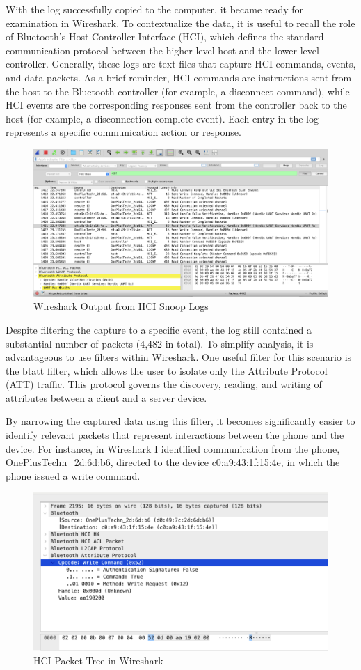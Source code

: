 With the log successfully copied to the computer, it became ready for examination in Wireshark. To contextualize the data, it is useful to recall the role of Bluetooth’s Host Controller Interface (HCI), which defines the standard communication protocol between the higher-level host and the lower-level controller. Generally, these logs are text files that capture HCI commands, events, and data packets. As a brief reminder, HCI commands are instructions sent from the host to the Bluetooth controller (for example, a disconnect command), while HCI events are the corresponding responses sent from the controller back to the host (for example, a disconnection complete event). Each entry in the log represents a specific communication action or response.
\begin{figure}[H]
	\centering
	\includegraphics[width=0.7\linewidth]{hci_snoop_log}
	\caption{Wireshark Output from HCI Snoop Logs}
	\label{fig:hcisnooplog}
\end{figure}
Despite filtering the capture to a specific event, the log still contained a substantial number of packets (4,482 in total). To simplify analysis, it is advantageous to use filters within Wireshark. One useful filter for this scenario is the btatt filter, which allows the user to isolate only the Attribute Protocol (ATT) traffic. This protocol governs the discovery, reading, and writing of attributes between a client and a server device.

By narrowing the captured data using this filter, it becomes significantly easier to identify relevant packets that represent interactions between the phone and the device. For instance, in Wireshark I identified communication from the phone, OnePlusTechn\_2d:6d:b6, directed to the device c0:a9:43:1f:15:4e, in which the phone issued a write command.

\begin{figure}
	\centering
	\includegraphics[width=0.7\linewidth]{hci_tree_wireshark}
	\caption{HCI Packet Tree in Wireshark}
	\label{fig:hcitreewireshark}
\end{figure}

